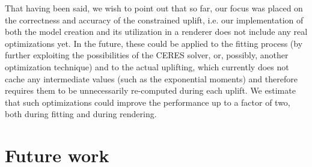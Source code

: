 That having been said, we wish to point out that so far, our focus was placed on the correctness and accuracy of the constrained uplift, i.e. our implementation of both the model creation and its utilization in a renderer does not include any real optimizations yet. In the future, these could be applied to the fitting process (by further exploiting the possibilities of the CERES solver, or, possibly, another optimization technique) and to the actual uplifting, which currently does not cache any intermediate values (such as the exponential moments) and therefore requires them to be unnecessarily re-computed during each uplift. We estimate that such optimizations could improve the performance up to a factor of two, both during fitting and during rendering.

\section{Future work} \label{sec:futureWork}

